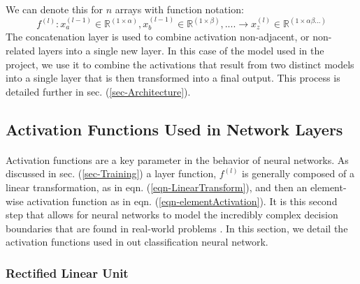 \documentclass[12pt,letterpaper]{article}
\begin{document}
\paragraph*{}We can denote this for $n$ arrays with function notation:
\begin{equation}
\label{eqn-ConcatenationFunction}
f^{(l)} : x^{(l-1)}_{a} \in \mathbb{R}^{(1 \times \alpha)} , x^{(l-1)}_{b} \in \mathbb{R}^{(1 \times \beta)} , ....  \rightarrow
x^{(l)}_{z} \in \mathbb{R}^{(1 \times \alpha\beta...)}
\end{equation}
The concatenation layer is used to combine activation non-adjacent, or non-related layers into a single new layer. In this case of the model used in the project, we use it to combine the activations that result from two distinct models into a single layer that is then transformed into a final output. This process is detailed further in sec. (\ref{sec-Architecture}).


\subsection{Activation Functions Used in Network Layers}
\label{sec-ActivationFunctions}

\paragraph*{}Activation functions are a key parameter in the behavior of neural networks. As discussed in sec. (\ref{sec-Training}) a layer function, $f^{(l)}$ is generally composed of a linear transformation, as in eqn. (\ref{eqn-LinearTransform}), and then an element-wise activation function as in eqn. (\ref{eqn-elementActivation}). It is this second step that allows for neural networks to model the incredibly complex decision boundaries that are found in real-world problems \cite{Geron,Loy}. In this section, we detail the activation functions used in out classification neural network. 

\subsubsection{Rectified Linear Unit}
\end{document}
